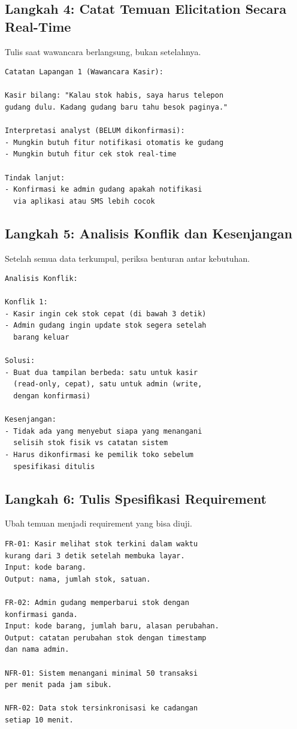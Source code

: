 \documentclass[11pt,a4paper]{article}
\begin{document}
\subsection{Langkah 4: Catat Temuan Elicitation Secara Real-Time}

Tulis saat wawancara berlangsung, bukan setelahnya.

\begin{lstlisting}[style=out]
Catatan Lapangan 1 (Wawancara Kasir):

Kasir bilang: "Kalau stok habis, saya harus telepon
gudang dulu. Kadang gudang baru tahu besok paginya."

Interpretasi analyst (BELUM dikonfirmasi):
- Mungkin butuh fitur notifikasi otomatis ke gudang
- Mungkin butuh fitur cek stok real-time

Tindak lanjut:
- Konfirmasi ke admin gudang apakah notifikasi
  via aplikasi atau SMS lebih cocok
\end{lstlisting}

\subsection{Langkah 5: Analisis Konflik dan Kesenjangan}

Setelah semua data terkumpul, periksa benturan antar kebutuhan.

\begin{lstlisting}[style=out]
Analisis Konflik:

Konflik 1:
- Kasir ingin cek stok cepat (di bawah 3 detik)
- Admin gudang ingin update stok segera setelah
  barang keluar

Solusi:
- Buat dua tampilan berbeda: satu untuk kasir
  (read-only, cepat), satu untuk admin (write,
  dengan konfirmasi)

Kesenjangan:
- Tidak ada yang menyebut siapa yang menangani
  selisih stok fisik vs catatan sistem
- Harus dikonfirmasi ke pemilik toko sebelum
  spesifikasi ditulis
\end{lstlisting}

\subsection{Langkah 6: Tulis Spesifikasi Requirement}

Ubah temuan menjadi requirement yang bisa diuji.

\begin{lstlisting}[style=out]
FR-01: Kasir melihat stok terkini dalam waktu
kurang dari 3 detik setelah membuka layar.
Input: kode barang.
Output: nama, jumlah stok, satuan.

FR-02: Admin gudang memperbarui stok dengan
konfirmasi ganda.
Input: kode barang, jumlah baru, alasan perubahan.
Output: catatan perubahan stok dengan timestamp
dan nama admin.

NFR-01: Sistem menangani minimal 50 transaksi
per menit pada jam sibuk.

NFR-02: Data stok tersinkronisasi ke cadangan
setiap 10 menit.
\end{lstlisting}
\end{document}

